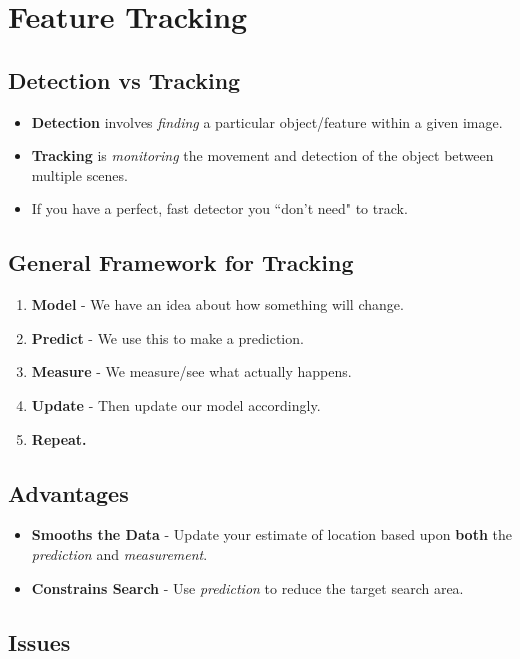 \documentclass[english, 10pt]{article}
\begin{document}
\section{Feature Tracking}

\subsection{Detection vs Tracking}

\begin{itemize}
\item \textbf{Detection} involves \textit{finding} a particular object/feature within a given image. 
\item \textbf{Tracking} is \textit{monitoring} the movement and detection of the object between multiple scenes.
\item If you have a perfect, fast detector you ``don't need" to track.
\end{itemize}

\subsection{General Framework for Tracking}

\begin{enumerate}
\item \textbf{Model} - We have an idea about how something will change.
\item \textbf{Predict} - We use this to make a prediction.
\item \textbf{Measure} - We measure/see what actually happens.
\item \textbf{Update} - Then update our model accordingly. 
\item \textbf{Repeat.}
\end{enumerate}

\subsection{Advantages}

\begin{itemize}
\item \textbf{Smooths the Data} - Update your estimate of location based upon \textbf{both} the \textit{prediction} and \textit{measurement}.
\item \textbf{Constrains Search} - Use \textit{prediction} to reduce the target search area.
\end{itemize}

\subsection{Issues}
\end{document}
